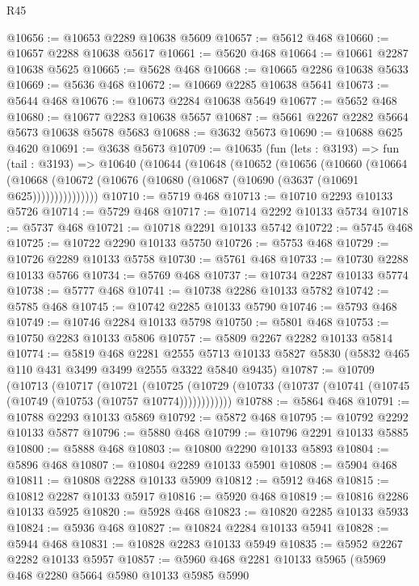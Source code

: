 \begin{lexlean}{R45}
\begin{coremodule}
@10656 := @10653 @2289 @10638 @5609
@10657 := @5612 @468
@10660 := @10657 @2288 @10638 @5617
@10661 := @5620 @468
@10664 := @10661 @2287 @10638 @5625
@10665 := @5628 @468
@10668 := @10665 @2286 @10638 @5633
@10669 := @5636 @468
@10672 := @10669 @2285 @10638 @5641
@10673 := @5644 @468
@10676 := @10673 @2284 @10638 @5649
@10677 := @5652 @468
@10680 := @10677 @2283 @10638 @5657
@10687 := @5661 @2267 @2282 @5664 @5673 @10638 @5678 @5683
@10688 := @3632 @5673
@10690 := @10688 @625 @4620
@10691 := @3638 @5673
@10709 := @10635
    (fun (lets : @3193) =>
    fun (tail : @3193) =>
    @10640
      (@10644
        (@10648
          (@10652
            (@10656
              (@10660
                (@10664
                  (@10668 (@10672 (@10676 (@10680 (@10687 (@10690 (@3637 (@10691 @625)))))))))))))))
@10710 := @5719 @468
@10713 := @10710 @2293 @10133 @5726
@10714 := @5729 @468
@10717 := @10714 @2292 @10133 @5734
@10718 := @5737 @468
@10721 := @10718 @2291 @10133 @5742
@10722 := @5745 @468
@10725 := @10722 @2290 @10133 @5750
@10726 := @5753 @468
@10729 := @10726 @2289 @10133 @5758
@10730 := @5761 @468
@10733 := @10730 @2288 @10133 @5766
@10734 := @5769 @468
@10737 := @10734 @2287 @10133 @5774
@10738 := @5777 @468
@10741 := @10738 @2286 @10133 @5782
@10742 := @5785 @468
@10745 := @10742 @2285 @10133 @5790
@10746 := @5793 @468
@10749 := @10746 @2284 @10133 @5798
@10750 := @5801 @468
@10753 := @10750 @2283 @10133 @5806
@10757 := @5809 @2267 @2282 @10133 @5814
@10774 := @5819
    @468
    @2281
    @2555
    @5713
    @10133
    @5827
    @5830
    (@5832 @465 @110 @431 @3499 @3499 @2555 @3322 @5840 @9435)
@10787 := @10709
    (@10713
      (@10717
        (@10721
          (@10725 (@10729 (@10733 (@10737 (@10741 (@10745 (@10749 (@10753 (@10757 @10774))))))))))))
@10788 := @5864 @468
@10791 := @10788 @2293 @10133 @5869
@10792 := @5872 @468
@10795 := @10792 @2292 @10133 @5877
@10796 := @5880 @468
@10799 := @10796 @2291 @10133 @5885
@10800 := @5888 @468
@10803 := @10800 @2290 @10133 @5893
@10804 := @5896 @468
@10807 := @10804 @2289 @10133 @5901
@10808 := @5904 @468
@10811 := @10808 @2288 @10133 @5909
@10812 := @5912 @468
@10815 := @10812 @2287 @10133 @5917
@10816 := @5920 @468
@10819 := @10816 @2286 @10133 @5925
@10820 := @5928 @468
@10823 := @10820 @2285 @10133 @5933
@10824 := @5936 @468
@10827 := @10824 @2284 @10133 @5941
@10828 := @5944 @468
@10831 := @10828 @2283 @10133 @5949
@10835 := @5952 @2267 @2282 @10133 @5957
@10857 := @5960
    @468
    @2281
    @10133
    @5965
    (@5969
      @468
      @2280
      @5664
      @5980
      @10133
      @5985
      @5990

\end{coremodule}
\end{lexlean}

